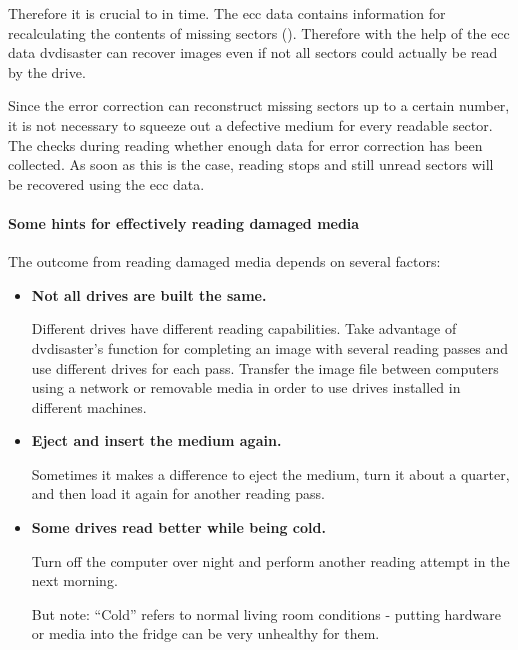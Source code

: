 \smallskip

Therefore it is crucial to  in
time. The ecc data contains information for recalculating the contents of missing
sectors ().
Therefore with the help of the ecc data dvdisaster can recover images even
if not all sectors could actually be read by the drive.

\smallskip

Since the error correction can reconstruct missing sectors up to a certain number,
it is not necessary to squeeze out a defective medium for every readable sector.
The  checks during reading
whether enough data for error correction has been collected. As soon as this is
the case, reading stops and still unread sectors will be recovered using the ecc data.

\paragraph{Some hints for effectively reading damaged media}\quad

\medskip

The outcome from reading damaged media depends on several factors:

\begin{itemize}
\item {\bf Not all drives are built the same.}
  
  Different drives have different reading capabilities. Take advantage of dvdisaster's
  function for completing an image with several reading passes and use different drives
  for each pass. Transfer the image file between computers using a network or removable
  media in order to use drives installed in different machines.

\item {\bf Eject and insert the medium again.}
  
  Sometimes it makes a difference to eject the medium, turn it about a quarter,
  and then load it again for another reading pass.

  \item {\bf Some drives read better while being cold.}

    Turn off the computer over night and perform another reading attempt in the next morning.

    But note: ``Cold'' refers to normal living room conditions - putting hardware or
    media into the fridge can be very unhealthy for them.
 \end{itemize}


